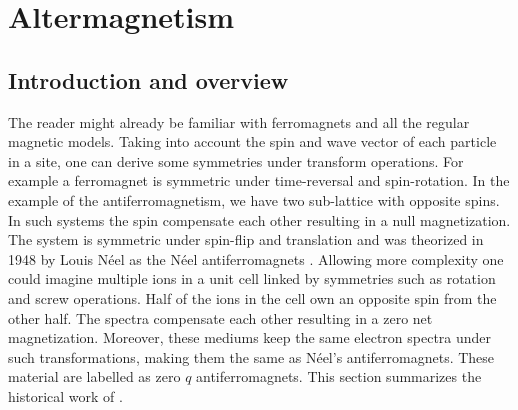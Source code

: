 \documentclass[../main.tex]{main.tex}
\begin{document}
\section{Altermagnetism}
\subsection{Introduction and overview}
The reader might already be familiar with ferromagnets and all the regular magnetic models. Taking into account the spin and
wave vector of each particle in a site, one can derive some symmetries under transform operations. For example a
ferromagnet is symmetric under time-reversal and spin-rotation. In the example of the antiferromagnetism,
we have two sub-lattice with opposite spins. In such systems the spin compensate each other resulting in a null magnetization.
The system is symmetric under spin-flip and translation and was theorized in 1948 by Louis Néel as the Néel antiferromagnets \cite{Neel1936}.
Allowing more complexity one could imagine multiple ions in a unit cell linked by symmetries such as rotation and screw operations. Half of the ions in the cell
own an opposite spin from the other half. The spectra compensate each other resulting in a zero net magnetization.
Moreover, these mediums keep the same electron spectra under such transformations, making them the same as Néel's antiferromagnets.
These material are labelled as zero $q$ antiferromagnets.
This section summarizes the historical work of \cite{Mazin2024}.\\
\end{document}
